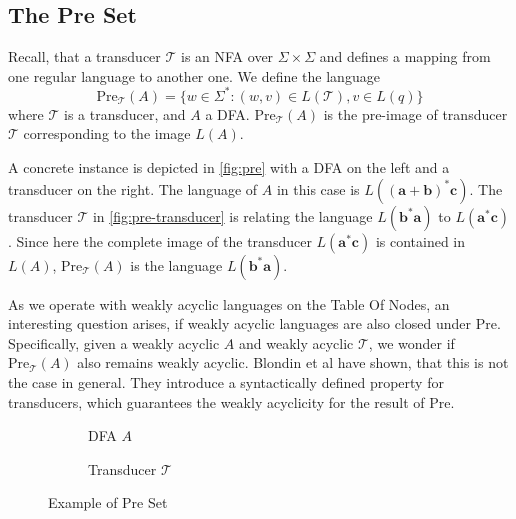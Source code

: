 \subsection{The Pre Set}
Recall, that a transducer $\mathcal{T}$ is an NFA over $\Sigma \times \Sigma$ and defines a mapping from one regular language to another one. We define the language 
\begin{equation*}
\text{Pre}_{\mathcal{T}}(A) = \{ w \in \Sigma^{*}: (w,v) \in L(\mathcal{T}), v \in L(q) \}
\end{equation*}
where $\mathcal{T}$ is a transducer, and $A$ a DFA. $\text{Pre}_{\mathcal{T}}(A)$ is the pre-image of transducer $\mathcal{T}$ corresponding to the image $L(A)$. 
\par
A concrete instance is depicted in \autoref{fig:pre} with a DFA on the left and a transducer on the right. The language of $A$ in this case is $L(\bm{(a+b)^{*}c})$. The transducer $\mathcal{T}$ in \autoref{fig:pre-transducer} is relating the language $L(\bm{b^{*}a})$ to $L(\bm{a^{*}c})$. 
Since here the complete image of the transducer $L(\bm{a^{*}c})$ is contained in $L(A)$, $\text{Pre}_{\mathcal{T}}(A)$ is the language $L(\bm{b^{*}a})$. 
\par 
As we operate with weakly acyclic languages on the Table Of Nodes, an interesting question arises, if weakly acyclic languages are also closed under $\text{Pre}$. Specifically, given a weakly acyclic $A$ and weakly acyclic $\mathcal{T}$, we wonder if $\text{Pre}_{\mathcal{T}}(A)$ also remains weakly acyclic. Blondin et al have shown, that this is not the case in general. They introduce a syntactically defined property for transducers, which guarantees the weakly acyclicity for the result of $\text{Pre}$\cite{blondin_24}.


\begin{figure}[ht]
\centering 
	\begin{subfigure}{.45\textwidth}	
		\centering 
    	 \caption{DFA $A$}\label{fig:pre-dfa}
    \end{subfigure}
    \begin{subfigure}{.45\textwidth}
	\centering 
    	\caption{Transducer $\mathcal{T}$}\label{fig:pre-transducer}
    \end{subfigure}
     \caption{Example of Pre Set}
     \label{fig:pre}
\end{figure}

